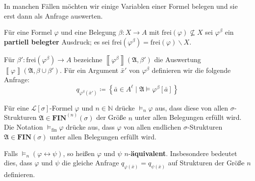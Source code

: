 In manchen Fällen möchten wir einige Variablen einer Formel belegen
und sie erst dann als Anfrage auswerten.
\begin{defn}
Für eine Formel $\varphi$ und eine Belegung $\beta:X\rightarrow A$
mit $\mathrm{frei}\left(\varphi\right)\nsubseteq X$ sei $\varphi^{\beta}$
ein \textbf{partiell belegter} Ausdruck; es sei $\mathrm{frei}\left(\varphi^{\beta}\right)=\mathrm{frei}\left(\varphi\right)\backslash X$.

Für $\beta':\mathrm{frei}\left(\varphi^{\beta}\right)\rightarrow A$
bezeichne $\left\llbracket \varphi^{\beta}\right\rrbracket \left(\mathfrak{A},\beta'\right)$
die Auswertung $\left\llbracket \varphi\right\rrbracket \left(\mathfrak{A},\beta\cup\beta'\right)$.
Für ein Argument $\bar{x}'$ von $\varphi^{\beta}$ definieren wir
die folgende Anfrage: 
\[
q_{\varphi^{\beta}\left(\bar{x}'\right)}\coloneqq\left\{ \bar{a}\in A^{\ell}\mid\mathfrak{A}\models\varphi^{\beta}\left[\bar{a}\right]\right\} 
\]
\end{defn}
%
\begin{defn}
Für eine $\mathcal{L}\left[\sigma\right]$-Formel $\varphi$ und $n\in\mathbb{N}$
drücke $\models_{n}\varphi$ aus, dass diese von allen $\sigma$-Strukturen
$\mathfrak{A}\in\mathbf{FIN}^{\left(n\right)}\left(\sigma\right)$
der Größe $n$ unter allen Belegungen erfüllt wird. Die Notation $\models_{\mathrm{fin}}\varphi$
drücke aus, dass $\varphi$ von allen endlichen $\sigma$-Strukturen
$\mathfrak{A}\in\mathbf{FIN}\left(\sigma\right)$ unter allen Belegungen
erfüllt wird.

Falls $\models_{n}\left(\varphi\leftrightarrow\psi\right)$, so heißen
$\varphi$ und $\psi$ $n$-\textbf{äquivalent}. Insbesondere bedeutet
dies, dass $\varphi$ und $\psi$ die gleiche Anfrage $q_{\varphi\left(\bar{x}\right)}=q_{\psi\left(\bar{x}\right)}$
auf Strukturen der Größe $n$ definieren.
\end{defn}

